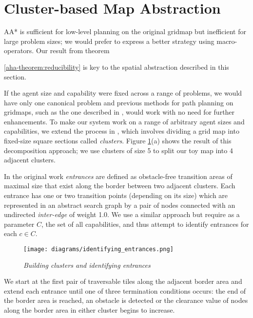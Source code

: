 \section{Cluster-based Map Abstraction}
\label{aha:mapabstraction}
AA* is sufficient for low-level planning on the original gridmap but inefficient for large problem sizes; we would prefer to express a better strategy using macro-operators.
Our result from theorem {\ref{aha-theorem:reducibility} is key to the spatial abstraction described in this section.
\par \indent
If the agent size and capability were fixed across a range of problems, 
we would have only one canonical problem and previous methods for path planning
on gridmaps, such as the one described in \cite{botea04}, 
would work with no need for further enhancements.
To make our system work on a range of arbitrary agent sizes and capabilities,
we extend the process in \cite{botea04}, which involves dividing a grid map into fixed-size square sections called \emph{clusters}. 
Figure \ref{aha-fig:clustersandentrances}(a) shows the result of this decomposition approach; we use clusters of size 5 to split our toy map into 4 adjacent clusters. 
\par \indent
In the original work \emph{entrances} are defined as obstacle-free transition areas of maximal size that exist along the border between two adjacent clusters.
Each entrance has one or two transition points (depending on its size) which are represented in an abstract search graph by a pair of nodes connected with an undirected \emph{inter-edge} of weight 1.0. 
We use a similar approach but require as a parameter $C$, the set of all capabilities, and thus attempt to identify entrances for each $c \in C$. 
\begin{figure}[htbp]
	\vspace{-9pt}
        \caption{\emph{Building clusters and identifying entrances} }
        \begin{center}
                        \texttt{[image: diagrams/identifying\_entrances.png]}
        \end{center}
        \label{aha-fig:clustersandentrances}
	\vspace{-6pt}
\end{figure}
\par \indent
We start at the first pair of traversable tiles along the adjacent border area and extend each entrance until one of three termination conditions occurs: the end of the border area is reached, an obstacle is detected or the clearance value of nodes along the border area in either cluster begins to increase. 
}
